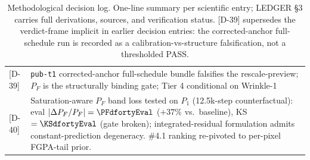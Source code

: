 \begin{table}[t]
\begin{tabular}{l|p{}}
    {[D-39]} & \texttt{pub-t1} corrected-anchor full-schedule bundle falsifies the rescale-preview; $P_F$ is the structurally binding gate; Tier 4 conditional on Wrinkle-1 \\
    {[D-40]} & Saturation-aware $P_F$ band loss tested on $P_1$ (12.5k-step counterfactual): eval $|\Delta P_F/P_F|=\PFdfortyEval$ ($+37\%$ vs.\ baseline), KS $=\KSdfortyEval$ (gate broken); integrated-residual formulation admits constant-prediction degeneracy. \#4.1 ranking re-pivoted to per-pixel FGPA-tail prior. \\
    \end{tabular}
    \caption{Methodological decision log. One-line summary per scientific entry; LEDGER \S3 carries full derivations, sources, and verification status. [D-39] supersedes the verdict-frame implicit in earlier decision entries: the corrected-anchor full-schedule run is recorded as a calibration-vs-structure falsification, not a thresholded PASS.}
    \label{tab:decision-log}
\end{table}
